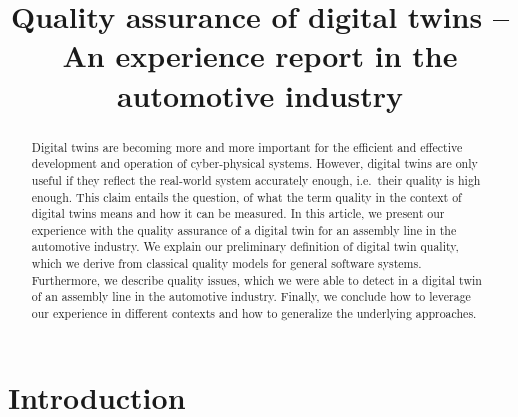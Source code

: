 \documentclass[9pt,conference]{IEEEtran}
\begin{document}
    \title{Quality assurance of digital twins -- An experience report in the automotive industry}
    \author{
        \and
    }
    \maketitle

    \begin{abstract}
        Digital twins are becoming more and more important for the efficient and effective development and operation of cyber-physical systems.
        However, digital twins are only useful if they reflect the real-world system accurately enough, i.e.\ their quality is high enough.
        This claim entails the question, of what the term quality in the context of digital twins means and how it can be measured.
        In this article, we present our experience with the quality assurance of a digital twin for an assembly line in the automotive industry.
        We explain our preliminary definition of digital twin quality, which we derive from classical quality models for general software systems.
        Furthermore, we describe quality issues, which we were able to detect in a digital twin of an assembly line in the automotive industry.
        Finally, we conclude how to leverage our experience in different contexts and how to generalize the underlying approaches.
    \end{abstract}

    \section{Introduction}\label{section:introduction}
\end{document}
